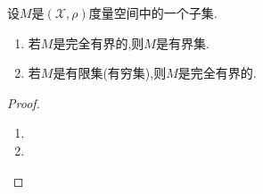 \documentclass[../../main.tex]{subfiles}%
\begin{document}
\begin{proposition}\label{proposition:完全有界必有界}
设$M$是$(\mathscr{X},\rho)$度量空间中的一个子集.
\begin{enumerate}[(1)]
\item\label{proposition:完全有界必有界-1} 若$M$是完全有界的,则$M$是有界集.

\item\label{proposition:完全有界必有界-2} 若$M$是有限集(有穷集),则$M$是完全有界的.
\end{enumerate}
\end{proposition}
\begin{proof}
\begin{enumerate}[(1)]
\item 

\item 
\end{enumerate}

\end{proof}
\end{document}
